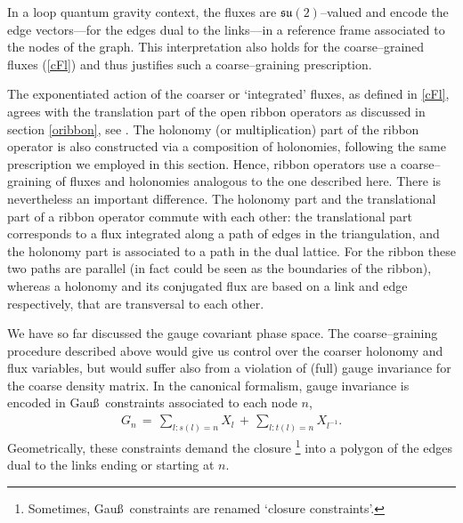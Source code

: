 \documentclass[nofootinbib,superscriptaddress,eqsecnum,tightenlines,11pt]{revtex4-1}
\def\ba{\begin{eqnarray}}
\def\ea{\end{eqnarray}}
\begin{document}
In a loop quantum gravity context, the fluxes are $\mathfrak{su}(2)$--valued and encode the edge vectors---for the edges dual to the links---in a reference frame associated to the nodes of the graph. 
This interpretation also holds for the coarse--grained fluxes (\ref{cFl}) and thus justifies such a coarse--graining prescription.  

The exponentiated action of the  coarser or `integrated' fluxes, as defined in \eqref{cFl}, agrees with the translation part of the open ribbon operators as discussed in section \ref{oribbon}, see \cite{BDG15}. 
The holonomy (or multiplication) part of the ribbon operator is also constructed via a composition of holonomies, following the same prescription we employed in this section. 
Hence, ribbon operators use a coarse--graining of fluxes and holonomies analogous to the one described here.
There is nevertheless an important difference. The holonomy part and the translational part of a ribbon operator commute with each other: the translational part corresponds to a flux integrated along a path of edges in the triangulation, and the holonomy part  is associated to a path in the dual lattice. 
For the ribbon these two paths are parallel (in fact could be seen as the boundaries of the ribbon), whereas a holonomy and its conjugated flux are based on a link and edge respectively, that are transversal to each other. 

We have so far discussed the gauge covariant phase space. 
The coarse--graining procedure described above would give us control over the coarser holonomy and flux variables, but would suffer also from a violation of (full) gauge invariance for the coarse density matrix. 
In the canonical formalism, gauge invariance is encoded in Gau\ss~constraints associated to each node $n$,
\ba\label{Gauss2}
G_n\,=\, \sum_{ l: s(l)=n} X_l \,+\, \sum_{l: t(l)=n} X_{l^{-1}} .
\ea
Geometrically, these constraints demand the closure%
\footnote{Sometimes, Gau\ss~constraints are renamed `closure constraints'.}
into a polygon of the edges dual to the links ending or starting at $n$. 
\end{document}
